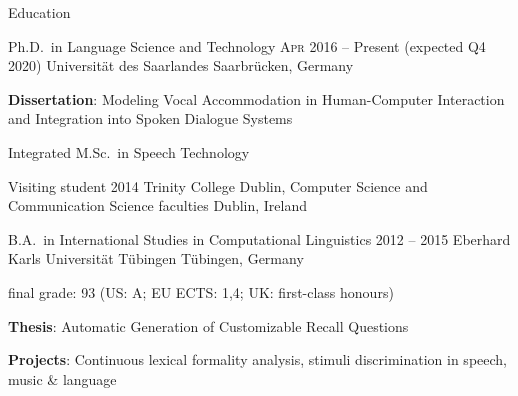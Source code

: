 \documentclass{resume} %
\begin{document}
\begin{rSection}{Education}

\begin{rSubsection}
	{Ph.D.\ in Language Science and Technology}
	{\textsc{Apr} 2016 -- Present (expected Q4 2020)}
	{Universität des Saarlandes}
	{Saarbrücken, Germany} %
	
	\setlength{\itemindent}{.7cm}
		
	\item \textbf{Dissertation}: Modeling Vocal Accommodation in Human-Computer Interaction and Integration \hspace*{3.4cm}into Spoken Dialogue Systems %
	\item Integrated M.Sc.\ in Speech Technology
\end{rSubsection}

\begin{rSubsection}
	{Visiting student}
	{2014}
	{Trinity College Dublin, Computer Science and Communication Science faculties}
	{Dublin, Ireland}
	
	\setlength{\itemindent}{.7cm}
	
	\item[]
\end{rSubsection}

\begin{rSubsection}
	{B.A.\ in International Studies in Computational Linguistics}
	{2012 -- 2015}
	{Eberhard Karls Universität Tübingen}
	{Tübingen, Germany}
	
	\vspace*{-.2cm}
	\item[]{final grade: 93 {\footnotesize (US: A; EU ECTS: 1,4; UK: first-class honours)}}
	\vspace*{.2cm}

	\setlength{\itemindent}{.7cm}
	
	\item \textbf{Thesis}: Automatic Generation of Customizable Recall Questions
	\item \textbf{Projects}: Continuous lexical formality analysis, stimuli discrimination in speech, music \& language
\end{rSubsection}

\end{rSection}
\end{document}
